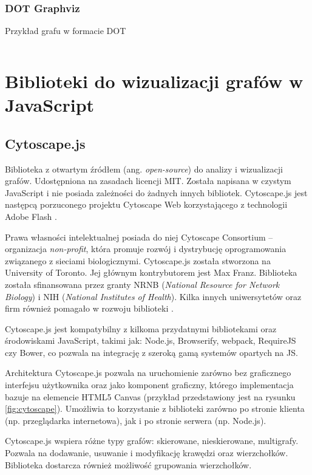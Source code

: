 \subsubsection{DOT Graphviz} 
\begin{listing}[H]
    \caption{Przykład grafu w formacie DOT}
    \inputminted{text}{example.gv}
    \label{lst:dot-example}
\end{listing}

\section{Biblioteki do wizualizacji grafów w JavaScript}

\subsection{Cytoscape.js}

Biblioteka z otwartym źródłem (ang. \textit{open-source}) do analizy i wizualizacji grafów. Udostępniona na zasadach licencji MIT. Została napisana w czystym JavaScript i nie posiada zależności do żadnych innych bibliotek. Cytoscape.js jest następcą porzuconego projektu Cytoscape Web korzystającego z technologii Adobe Flash \cite[309]{franz}. 

Prawa własności intelektualnej posiada do niej Cytoscape Consortium -- organizacja \textit{non-profit}, która promuje rozwój i dystrybucję oprogramowania związanego z sieciami biologicznymi. Cytoscape.js została stworzona na University of Toronto. Jej głównym kontrybutorem jest Max Franz. Biblioteka została sfinansowana przez granty NRNB (\textit{National Resource for Network Biology}) i NIH (\textit{National Institutes of Health}). Kilka innych uniwersytetów oraz firm również pomagało w rozwoju biblioteki \cite{cytoscape}. 

Cytoscape.js jest kompatybilny z kilkoma przydatnymi bibliotekami oraz środowiskami JavaScript, takimi jak: Node.js, Browserify, webpack, RequireJS czy Bower, co pozwala na integrację z szeroką gamą systemów opartych na JS. 

Architektura Cytoscape.js pozwala na uruchomienie zarówno bez graficznego interfejsu użytkownika oraz jako komponent graficzny, którego implementacja bazuje na elemencie HTML5 Canvas (przykład przedstawiony jest na rysunku \ref{fig:cytoscape}). Umożliwia to korzystanie z biblioteki zarówno po stronie klienta (np. przeglądarka internetowa), jak i po stronie serwera (np. Node.js).

Cytoscape.js wspiera różne typy grafów: skierowane, nieskierowane, multigrafy. Pozwala na dodawanie, usuwanie i modyfikację krawędzi oraz wierzchołków. Biblioteka dostarcza również możliwość grupowania wierzchołków.

